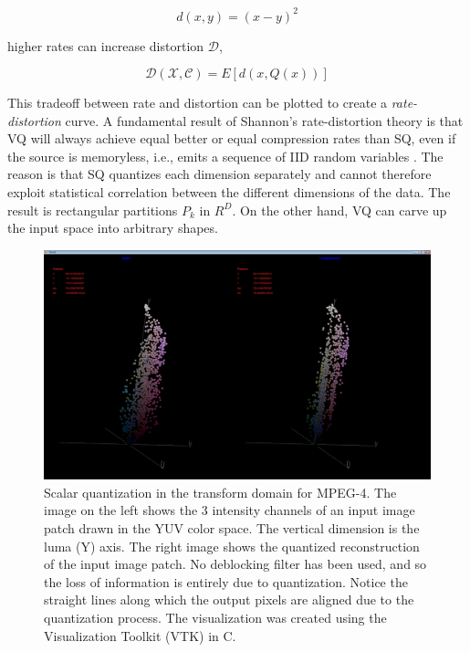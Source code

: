 \begin{equation}
d(x,y)=(x-y)^2 
\end{equation}

higher rates can increase distortion $\mathcal{D}$,

\begin{equation}
\mathcal{D(\mathcal{X}, \mathcal{C})} =E\left[d(x, Q(x)) \right]
\end{equation}

This tradeoff between rate and distortion can be plotted to create a \emph{rate-distortion} curve.  A fundamental result of Shannon's rate-distortion theory is that VQ will always achieve equal better or equal compression rates than SQ, even if the source is memoryless, i.e., emits a sequence of IID random variables \cite{1984_JNL_VQ_Gray}.   The reason is that SQ quantizes each dimension separately and cannot therefore exploit statistical correlation between the different dimensions of the data.  The result is rectangular partitions $P_k$ in $R^D$.  On the other hand, VQ can carve up the input space into arbitrary shapes.

\begin{figure}[t]		
	\center	
	\includegraphics[height=0.4\textheight]{thesis/MPEG4_VTK.png}
	\caption{Scalar quantization in the transform domain for MPEG-4.  The image on the left shows the 3 intensity channels of an input image patch drawn in the YUV color space.  The vertical dimension is the luma (Y) axis.  The right image shows the quantized reconstruction of the input image patch.  No deblocking filter has been used, and so the loss of information is entirely due to quantization.  Notice the straight lines along which the output pixels are aligned due to the quantization process.  The visualization was created using the Visualization Toolkit (VTK) \cite{VTK} in C.}
	\label{fig:MPEG4_VTK}
\end{figure}


